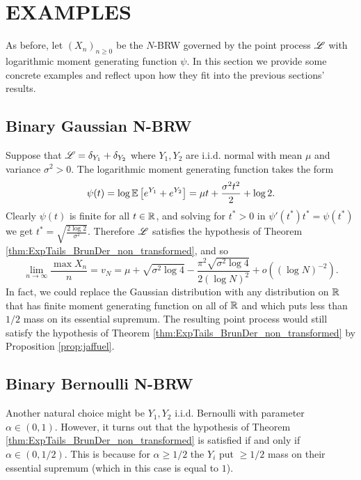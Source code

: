 \section{EXAMPLES}\label{sec:examples}
As before, let $(X_n)_{n \geq 0}$ be the $N$-BRW governed by the point process $\mathscr{L}$ with logarithmic moment generating function $\psi$. In this section we provide some concrete examples and reflect upon how they fit into the previous sections' results. 







\subsection{Binary Gaussian N-BRW}\label{subsec:examples_gaussian_BRW}
Suppose that $\mathscr{L} = \delta_{Y_1} + \delta_{Y_2}$ where $Y_1, Y_2$ are i.i.d. normal with mean $\mu$ and variance $\sigma^2 > 0$. The logarithmic moment generating function takes the form
\begin{equation}\nonumber
\psi(t) = \log \mathbb{E}\left[ e^{Y_1} + e^{Y_2} \right] = \mu t + \frac{\sigma^2 t^2}{2} + \log 2. 
\end{equation}
Clearly $\psi(t)$ is finite for all $t \in \mathbb{R}$, and solving for $t^* > 0$ in $\psi'(t^*) t^* = \psi(t^*)$ we get $t^* = \sqrt{\frac{2 \log 2}{\sigma^2}}$. Therefore $\mathscr{L}$ satisfies the hypothesis of Theorem \ref{thm:ExpTails_BrunDer_non_transformed}, and so 
\begin{equation}\nonumber
\lim\limits_{n \to \infty} \frac{\max X_n}{n} = v_N = \mu + \sqrt{\sigma^2 \log 4} - \frac{\pi^2 \sqrt{\sigma^2 \log 4}}{2 (\log N)^2} + o((\log N)^{-2}). 
\end{equation}
In fact, we could replace the Gaussian distribution with any distribution on $\mathbb{R}$ that has finite moment generating function on all of $\mathbb{R}$ and which puts less than $1/2$ mass on its essential supremum. The resulting point process would still satisfy the hypothesis of Theorem \ref{thm:ExpTails_BrunDer_non_transformed} by Proposition \ref{prop:jaffuel}. \\








\subsection{Binary Bernoulli N-BRW}\label{subsec:binary_bernoulli_BRW}
Another natural choice might be $Y_1, Y_2$ i.i.d. Bernoulli with parameter $\alpha \in (0, 1)$. However, it turns out that the hypothesis of Theorem \ref{thm:ExpTails_BrunDer_non_transformed} is satisfied if and only if $\alpha \in (0, 1/2)$. This is because for $\alpha \geq 1/2$ the $Y_i$ put $\geq 1/2$ mass on their essential supremum (which in this case is equal to $1$). \\

